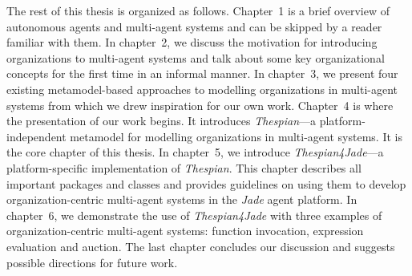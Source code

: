 The rest of this thesis is organized as follows.
Chapter~1 is a brief overview of autonomous agents and multi-agent systems and can be skipped by a reader familiar with them.
In chapter~2, we discuss the motivation for introducing organizations to multi-agent systems and talk about some key organizational concepts for the first time in an informal manner.
In chapter~3, we present four existing metamodel-based approaches to modelling organizations in multi-agent systems from which we drew inspiration for our own work.
Chapter~4 is where the presentation of our work begins. It introduces \textit{Thespian}---a platform-independent metamodel for modelling organizations in multi-agent systems. It is the core chapter of this thesis.
In chapter~5, we introduce \textit{Thespian4Jade}---a platform-specific implementation of \textit{Thespian}. This chapter describes all important packages and classes and provides guidelines on using them to develop organization-centric multi-agent systems in the \textit{Jade} agent platform.
In chapter~6, we demonstrate the use of \textit{Thespian4Jade} with three examples of organization-centric multi-agent systems: function invocation, expression evaluation and auction.
The last chapter concludes our discussion and suggests possible directions for future work.